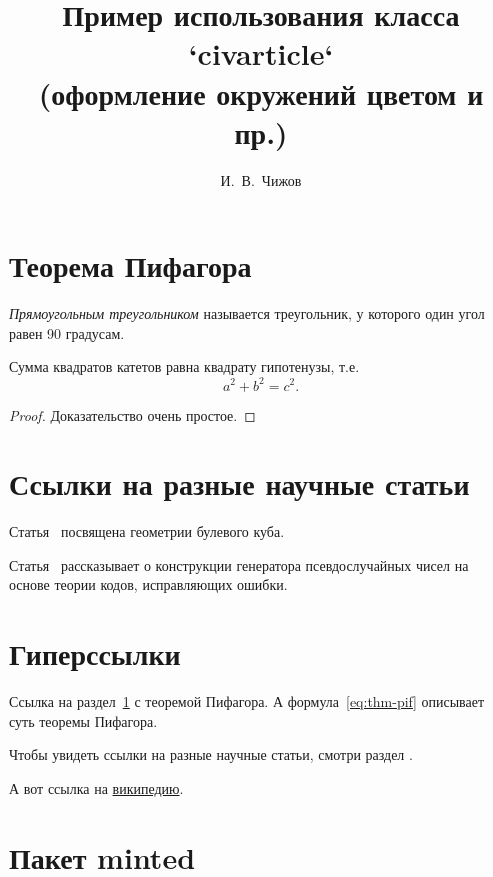 \documentclass[12pt, minted]{civarticle}
\title{
    Пример использования класса `civarticle`\\
    \small{(оформление окружений цветом и пр.)}
}
\author{И.~В.~Чижов}
\begin{document}
    \section{Теорема Пифагора}
    \label{sec:thm-pif}
    \begin{definition}
        \label{def:triangle}
        \emph{Прямоугольным треугольником} называется треугольник, у которого один угол равен 90 градусам.
    \end{definition}
    \begin{theorem}
        Сумма квадратов катетов равна квадрату гипотенузы, т.е.
        \begin{equation}
            \label{eq:thm-pif}
            a^2+b^2=c^2.
        \end{equation}
    \end{theorem}
    \begin{proof}
        Доказательство очень простое.
    \end{proof}
    \Blindtext[11][1]


    \section{Ссылки на разные научные статьи}
    \label{sec:ref-to-articles}

    Статья~\cite{ahlswede1977} посвящена геометрии булевого куба.

    Статья~\cite{ahmed2013} рассказывает о конструкции генератора псевдослучайных чисел на основе теории кодов, исправляющих ошибки.


    \section{Гиперссылки}
    \label{sec:hyper}

    Ссылка на раздел~\ref{sec:thm-pif} с теоремой Пифагора.
    А формула~\eqref{eq:thm-pif} описывает суть теоремы Пифагора.

    Чтобы увидеть ссылки на разные научные статьи, смотри раздел \hyperref[sec:ref-to-articles]{}.

    А вот ссылка на \href{www.wikipedia.ru}{википедию}.


    \section{Пакет minted}
    \label{sec:minted}
    \if \MINTED\empty
    \else
        \inputminted{python}{code.py}
    \fi
\end{document}
